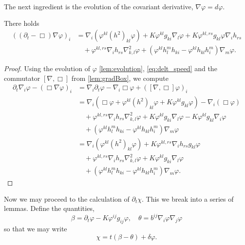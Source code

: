 \documentclass{amsart}
\begin{document}
The next ingredient is the evolution of the covariant derivative, \(\nabla \varphi = d\varphi\).

\begin{lemma}
\label{lem:Evgradphi}
There holds
\[
\begin{split}
\left((\partial_{t}-\Box)\nabla\varphi\right)_{i} &= \nabla_i \left(\varphi^{kl} (h^2)_{kl}\varphi\right) + K\varphi^{kl}g_{ki} \nabla_l \varphi + K\varphi^{kl,rs} g_{kl}\varphi \nabla_i h_{rs}  \\
&\quad + \varphi^{kl,rs}\nabla_i h_{rs}\nabla^2_{k,l} \varphi + \left(\varphi^{kl}h^{m}_{l}h_{ki} - \varphi^{kl}h_{kl}h^{m}_{i}\right) \nabla_m \varphi.
\end{split}
\]
\end{lemma}

\begin{proof}
Using the evolution of \(\varphi\) \cref{lem:evolution}, \cref{eq:delt_speed} and the commutator \([\nabla, \Box]\) from \cref{lem:gradBox}, we compute
\[
\begin{split}
\partial_{t}\nabla_i \varphi - (\Box\nabla \varphi)_{i} &= \nabla_i \partial_t \varphi - \nabla_i \Box \varphi + ([\nabla, \Box] \varphi)_i \\
&= \nabla_i \left(\Box\varphi + \varphi^{kl}(h^2)_{kl}\varphi + K \varphi^{kl}g_{kl}\varphi\right) - \nabla_i (\Box\varphi) \\
&\quad + \varphi^{kl,rs} \nabla_i h_{rs} \nabla^2_{k,l} \varphi + K\varphi^{kl}g_{ki} \nabla_l \varphi - K\varphi^{kl}g_{kl}\nabla_i \varphi \\
&\quad + (\varphi^{kl}h^{m}_{l}h_{ki} - \varphi^{kl}h_{kl}h^{m}_{i}) \nabla_m \varphi \\
&= \nabla_i (\varphi^{kl}(h^2)_{kl}\varphi) + K\varphi^{kl,rs}\nabla_i h_{rs}g_{kl}\varphi \\
&\quad + \varphi^{kl,rs} \nabla_i h_{rs} \nabla^2_{k,l} \varphi + K\varphi^{kl}g_{ki}\nabla_l \varphi \\
&\quad + (\varphi^{kl}h^{m}_{l}h_{ki} - \varphi^{kl}h_{kl}h^{m}_{i}) \nabla_m \varphi.
\end{split}
\]
\end{proof}

Now we may proceed to the calculation of \(\partial_t \chi\). This we break into a series of lemmas. Define the quantities,
\[
\beta = \partial_t \varphi - K\varphi^{ij}g_{ij}\varphi, \quad \theta =  b^{ij} \nabla_i \varphi \nabla_j \varphi
\]
so that we may write
\[
\chi =t(\beta - \theta) + \delta\varphi.
\]
\end{document}
